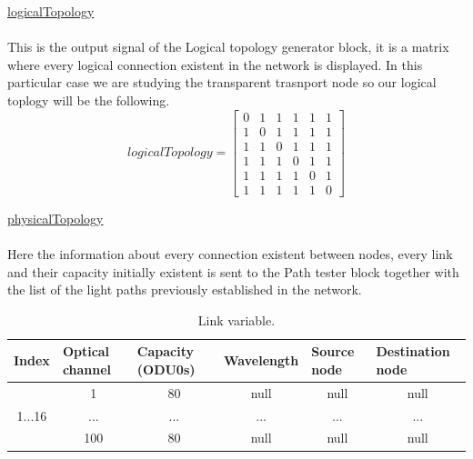 \underline{logicalTopology}\\
\\
This is the output signal of the Logical topology generator block, it is a matrix where every logical connection existent in the network is displayed. In this particular case we are studying the transparent trasnport node so our logical toplogy will be the following.\\

\[
logicalTopology=
\begin{bmatrix}
0 & 1 & 1 & 1 & 1 & 1 \\
1 & 0 & 1 & 1 & 1 & 1 \\
1 & 1 & 0 & 1 & 1 & 1 \\
1 & 1 & 1 & 0 & 1 & 1 \\
1 & 1 & 1 & 1 & 0 & 1 \\
1 & 1 & 1 & 1 & 1 & 0
\end{bmatrix}
\]

\underline{physicalTopology}\\
\\
Here the information about every connection existent between nodes, every link and their capacity initially existent is sent to the Path tester block together with the list of the light paths previously established in the network.

\begin{table}[H]
		\centering
	\begin{tabular}{|c|c|c|c|c|c|}
		\hline
		\multicolumn{1}{|l|}{Index} & \multicolumn{1}{l|}{Optical channel} & \multicolumn{1}{l|}{Capacity (ODU0s)} & \multicolumn{1}{l|}{Wavelength} & \multicolumn{1}{l|}{Source node} & \multicolumn{1}{l|}{Destination node} \\ \hline
		\multirow{3}{*}{1...16}     & 1                                    & 80                                    & null                            & null                             & null                                  \\ \cline{2-6} 
		& ...                                  & ...                                   & ...                             & ...                              & ...                                   \\ \cline{2-6} 
		& 100                                  & 80                                    & null                            & null                             & null                                  \\ \hline
	\end{tabular}
	\caption{Link variable.}
	\label{link_example}
\end{table}

